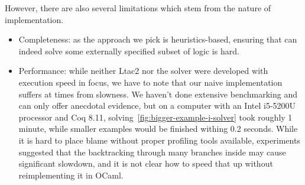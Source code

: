 However, there are also several limitations which stem from the nature of implementation.
\begin{itemize}
\item Completeness: as the approach we pick is heuristics-based, ensuring that  can indeed solve some externally specified subset of logic is hard.
\item Performance: while neither Ltac2 nor the solver were developed with execution speed in focus, we have to note that our naive implementation suffers at times from slowness.
  We haven't done extensive benchmarking and can only offer anecdotal evidence, but on a computer with an Intel i5-5200U processor and Coq 8.11, solving~\ref{fig:bigger-example-i-solver} took roughly 1 minute, while smaller examples would be finished withing 0.2 seconds.
  While it is hard to place blame without proper profiling tools available, experiments suggested that the backtracking through many branches inside  may cause significant slowdown, and it is not clear how to speed that up without reimplementing it in OCaml.
\end{itemize}

